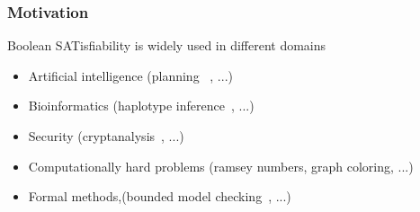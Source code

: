 \documentclass{beamer}
\begin{document}
\begin{frame}

\frametitle{Motivation}
Boolean SATisfiability is widely used in different domains

\begin{itemize}
	\item Artificial intelligence (planning  ~\cite{planning_92}, ...)
	\item Bioinformatics  (haplotype inference~\cite{biology_06}, ...)
	\item Security (cryptanalysis~\cite{crypto_00}, ...)
	\item Computationally hard problems (ramsey numbers, graph coloring, ...)
	\item Formal methods,(bounded model checking~\cite{bmc_99}, ...)
\end{itemize}

\end{frame}
\end{document}
